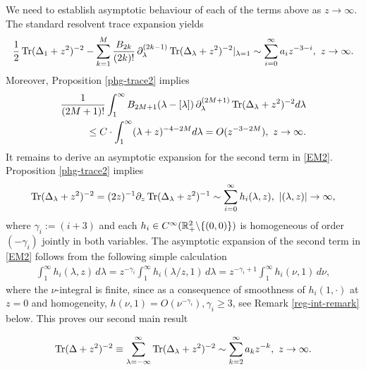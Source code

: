 We need to establish asymptotic behaviour of each of the terms above as $z\to \infty$.
The standard resolvent trace expansion yields 
\begin{equation}
\label{exp1}
\begin{split}
\frac{1}{2}\operatorname{Tr}(\Delta_1+z^2)^{-2}  - \sum_{k=1}^M \frac{B_{2k}}{(2k)!} \, 
\partial_\lambda^{(2k-1)}\operatorname{Tr}(\Delta_\lambda+z^2)^{-2}|_{\lambda=1} 
\sim \sum_{i=0}^{\infty} a_i z^{-3-i}, \ z\to \infty.
\end{split}
\end{equation}
Moreover, Proposition \ref{phg-trace2} implies
\begin{equation}
\label{exp2}
\begin{split}
\frac{1}{(2M+1)!} \int_1^\infty B_{2M+1}(\lambda-[\lambda]) \, 
\partial_\lambda^{(2M+1)}\Tr(\Delta_\lambda+z^2)^{-2} d\lambda\\
\leq C \cdot \int_1^\infty (\lambda+z)^{-4-2M} d\lambda =O(z^{-3-2M}), \ z\to\infty.
\end{split}
\end{equation}
It remains to derive an asymptotic expansion for the second term in \eqref{EM2}.
Proposition \ref{phg-trace2} implies
\begin{align*}
\Tr(\Delta_\lambda+z^2)^{-2} = (2z)^{-1} \partial_z
\Tr(\Delta_\lambda+z^2)^{-1} \sim \sum_{i=0}^\infty h_i (\lambda,z), \ |(\lambda,z)| \to \infty,
\end{align*}
where $\gamma_i:=(i+3)$ and each $h_i\in C^{\infty}(\mathbb{R}^2_+\backslash \{(0,0)\})$
is homogeneous of order $(-\gamma_i)$ jointly in both variables. 
The asymptotic expansion of the second term in \eqref{EM2}
follows from the following simple calculation
\begin{align*}
\int_1^\infty h_i(\lambda, z) \, d\lambda = 
z^{-\gamma_i} \int_1^\infty h_i(\lambda / z, 1) \, d\lambda =
z^{-\gamma_i + 1} \int_1^\infty h_i(\nu, 1) \, d\nu,
\end{align*}
where the $\nu$-integral is finite, since as a consequence of 
smoothness of $h_i(1,\cdot)$ at $z=0$ and homogeneity, $h(\nu,1) = O(\nu^{-\gamma_i}), \gamma_i\geq 3$, 
see Remark \ref{reg-int-remark} below.
This proves our second main result
\begin{theorem}
\begin{align}
\operatorname{Tr}(\Delta+z^2)^{-2} \equiv \sum_{\lambda=-\infty}^{\infty}\operatorname{Tr}(\Delta_\lambda+z^2)^{-2} 
\sim \sum_{k=2}^\infty a_k z^{-k}, \ z \to \infty. 
\end{align}
\end{theorem}


